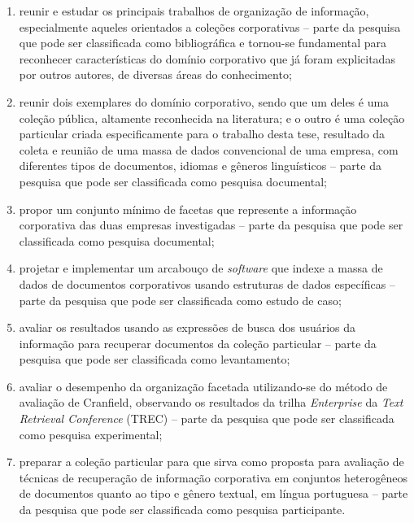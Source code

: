 \begin{enumerate}

\item reunir e estudar os principais trabalhos de organização de informação, especialmente aqueles orientados a coleções corporativas -- parte da pesquisa que pode ser classificada como bibliográfica e tornou-se fundamental para reconhecer características do domínio corporativo que já foram explicitadas por outros autores, de diversas áreas do conhecimento;

\item reunir dois exemplares do domínio corporativo, sendo que um deles é uma coleção pública, altamente reconhecida na literatura; e o outro é uma coleção particular criada especificamente para o trabalho desta tese, resultado da coleta e reunião de uma massa de dados convencional de uma empresa, com diferentes tipos de documentos, idiomas e gêneros linguísticos -- parte da pesquisa que pode ser classificada como pesquisa documental;

\item propor um conjunto mínimo de facetas que represente a informação corporativa das duas empresas investigadas -- parte da pesquisa que pode ser classificada como pesquisa documental; 

\item projetar e implementar um arcabouço de \textit{software} que indexe a massa de dados de documentos corporativos usando estruturas de dados específicas -- parte da pesquisa que pode ser classificada como estudo de caso;

\item avaliar os resultados usando as expressões de busca dos usuários da informação para recuperar documentos da coleção particular -- parte da pesquisa que pode ser classificada como levantamento;

\item avaliar o desempenho da organização facetada utilizando-se do método de avaliação de Cranfield, observando os resultados da trilha \textit{Enterprise} da \textit{Text Retrieval Conference} (TREC) -- parte da pesquisa que pode ser classificada como pesquisa experimental;

\item preparar a coleção particular para que sirva como proposta para avaliação de técnicas de recuperação de informação corporativa em conjuntos heterogêneos de documentos quanto ao tipo e gênero textual, em língua portuguesa -- parte da pesquisa que pode ser classificada como pesquisa participante.

\end{enumerate}

